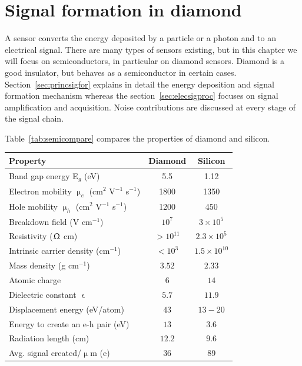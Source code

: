 \documentclass[11pt]{mytustyle}  %
\begin{document}
\baselineskip=15pt
\newcommand{\ga}{\greektext a\latintext}
\newcommand{\gmu}{\greektext m\latintext}

\chapter{Signal formation in diamond}
A sensor converts the energy deposited by a particle or a photon and to an electrical signal. There are many types of sensors existing, but in this chapter we will focus on semiconductors, in particular on diamond sensors. Diamond is a good insulator, but behaves as a semiconductor in certain cases. Section~\ref{sec:princsigfor} explains in detail the energy deposition and signal formation mechanism whereas the section~\ref{sec:elecsigproc} focuses on signal amplification and acquisition. Noise contributions are discussed at every stage of the signal chain.


Table~\ref{tab:semicompare} compares the properties of diamond and silicon. 

\begin{footnotesize}
\begin{center}
\begin{tabular}{   l  c  c   }
\hline
Property & Diamond & Silicon \\
\hline
Band gap energy E$_g$ (eV) & 5.5 & 1.12  \\
Electron mobility $\upmu_e$ (cm$^2$ V$^{-1}$ s$^{-1}$) & 1800 & 1350 \\
Hole mobility $\upmu_h$ (cm$^2$ V$^{-1}$ s$^{-1}$) & 1200 & 450 \\
Breakdown field (V cm$^{-1}$) & $10^{7}$ & $3\times 10^5$ \\
Resistivity ($\Upomega$ cm) & $>10^{11}$  & $2.3\times 10^5$  \\
Intrinsic carrier density (cm$^{-1}$) & $<10^3$ & $1.5\times 10^{10} $ \\
Mass density (g cm$^{-1}$) & $ 3.52$ & $2.33 $ \\
Atomic charge  & $6 $ & $ 14$ \\
Dielectric constant $\upvarepsilon$ & $5.7 $ & $11.9 $ \\
Displacement energy (eV/atom) & $43 $ & $13-20 $ \\
Energy to create an e-h pair  (eV) & $13 $ & $ 3.6$ \\
Radiation length (cm) & $ 12.2$ & $9.6 $ \\
Avg. signal created/$\upmu$m (e) & 36 & 89 \\\hline
\end{tabular}
\label{tab:semicompare}
\end{center}
\end{footnotesize}
\end{document}
